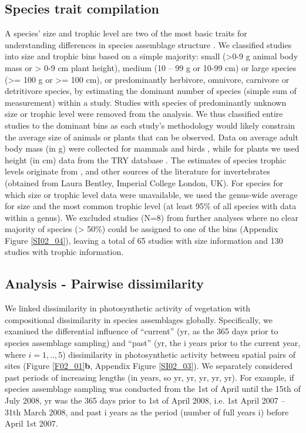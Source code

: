 \subsection{Species trait compilation}
A species’ size and trophic level are two of the most basic traits for understanding differences in species assemblage structure \citep{Speakman2005,Terborgh2015}. We classified studies into size and trophic bins based on a simple majority: small (>0-9 g animal body mass or > 0-9 cm plant height), medium (10 – 99 g or 10-99 cm) or large species (>= 100 g or >= 100 cm), or predominantly herbivore, omnivore, carnivore or detritivore species, by estimating the dominant number of species (simple sum of measurement) within a study. Studies with species of predominantly unknown size or trophic level were removed from the analysis. We thus classified entire studies to the dominant bins as each study’s methodology would likely constrain the average size of animals or plants that can be observed. Data on average adult body mass (in g) were collected for mammals \citep{Jones2009} and birds \citep{Myhrvold2015}, while for plants we used height (in cm) data from the TRY database \citep{Kattge2011}. The estimates of species trophic levels originate from \cite{Kissling2014}, \cite{Wilman2014} and other sources of the literature for invertebrates (obtained from Laura Bentley, Imperial College London, UK). For species for which size or trophic level data were unavailable, we used the genus-wide average for size and the most common trophic level (at least 95\% of all species with data within a genus). We excluded studies (N=8) from further analyses where no clear majority of species (> 50\%) could be assigned to one of the bins (Appendix Figure \ref{SI02_04}), leaving a total of 65 studies with size information and 130 studies with trophic information. 

\subsection{Analysis - Pairwise dissimilarity}
We linked dissimilarity in photosynthetic activity of vegetation with compositional dissimilarity in species assemblages globally. Specifically, we examined the differential influence of “current” (yr, as the 365 days prior to species assemblage sampling) and “past” (yr, the i years prior to the current year, where $i = 1,..,5$) dissimilarity in photosynthetic activity between spatial pairs of sites (Figure \ref{F02_01}\textbf{b}, Appendix Figure \ref{SI02_03}). We separately considered past periods of increasing lengths (in years, so yr, yr, yr, yr, yr). For example, if species assemblage sampling was conducted from the 1st of April until the 15th of July 2008, yr was the 365 days prior to 1st of April 2008, i.e. 1st April 2007 – 31th March 2008, and past i years as the period (number of full years i) before April 1st 2007.

